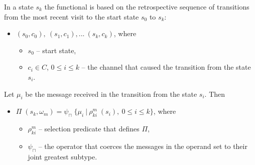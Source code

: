 In a state $s_{k}$ the functional is based on the retrospective sequence of transitions from the most recent visit to the start state $s_{0}$ to $s_{k}$:
  \begin{itemize}
  \item[] $(s_{0}, c_{0}), \: (s_{1}, c_{1}),... \: (s_{k}, c_{k})$, where
    \begin{itemize}
      \item[] $s_{0}$ -- start state,
      \item[] $c_{i} \in C$, $0 \le i \le k$ -- the channel that caused the transition from the state $s_{i}$.
    \end{itemize}
  \end{itemize}

Let $\mu_{i}$ be the message received in the transition from the state $s_{i}$. Then
  \begin{itemize}
  \item[] $\Pi \; (s_{k}, \omega_{m}) = \psi_{\sqcap} \; \{\mu_{i} \: | \: \rho_{ki}^{m} \; (s_{i}), \: 0 \le i \le k\}$, where
    \begin{itemize}
      \item[] $\rho_{ki}^{m}$ -- selection predicate that defines $\Pi$,
      \item[] $\psi_{\sqcap}$ -- the operator that coerces the messages in the operand set to their joint greatest subtype.
    \end{itemize}
  \end{itemize}

